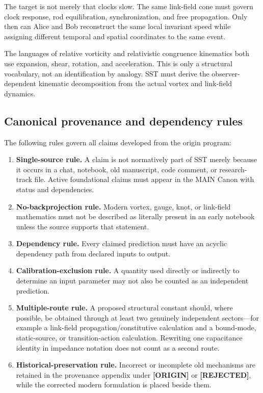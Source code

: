 \documentclass[11pt]{article}
\theoremstyle{definition}
\theoremstyle{plain}
\theoremstyle{remark}
\begin{document}
The target is not merely that clocks slow. The same link-field cone must govern
clock response, rod equilibration, synchronization, and free propagation. Only
then can Alice and Bob reconstruct the same local invariant speed while
assigning different temporal and spatial coordinates to the same event.

The languages of relative vorticity and relativistic congruence kinematics
both use expansion, shear, rotation, and acceleration. This is only a structural
vocabulary, not an identification by analogy. SST must derive the
observer-dependent kinematic decomposition from the actual vortex and link-field
dynamics.

\subsection{Canonical provenance and dependency rules}
\label{subsec:canonical_provenance_dependency_rules}

The following rules govern all claims developed from the origin program:

\begin{enumerate}
    \item \textbf{Single-source rule.}
    A claim is not normatively part of SST merely because it occurs in a chat,
    notebook, old manuscript, code comment, or research-track file. Active
    foundational claims must appear in the MAIN Canon with status and
    dependencies.

    \item \textbf{No-backprojection rule.}
    Modern vortex, gauge, knot, or link-field mathematics must not be described
    as literally present in an early notebook unless the source supports that
    statement.

    \item \textbf{Dependency rule.}
    Every claimed prediction must have an acyclic dependency path from declared
    inputs to output.

    \item \textbf{Calibration-exclusion rule.}
    A quantity used directly or indirectly to determine an input parameter may
    not also be counted as an independent prediction.

    \item \textbf{Multiple-route rule.}
    A proposed structural constant should, where possible, be obtained through
    at least two genuinely independent sectors---for example a link-field
    propagation/constitutive calculation and a bound-mode, static-source, or
    transition-action calculation. Rewriting one capacitance identity in
    impedance notation does not count as a second route.

    \item \textbf{Historical-preservation rule.}
    Incorrect or incomplete old mechanisms are retained in the provenance
    appendix under \textbf{[ORIGIN]} or \textbf{[REJECTED]}, while the corrected
    modern formulation is placed beside them.
\end{enumerate}
\end{document}
